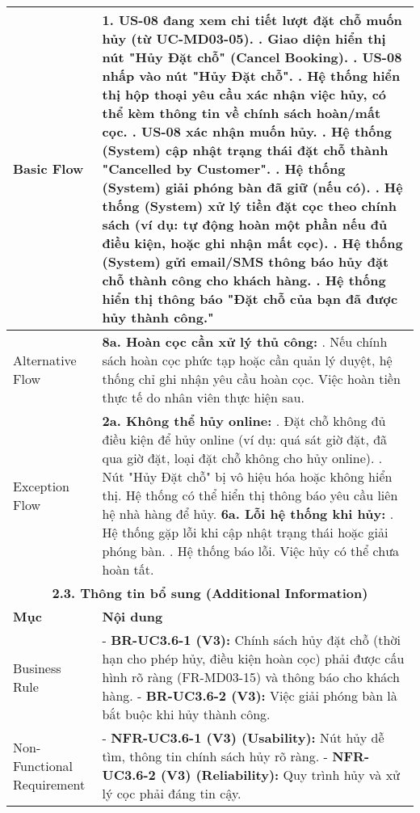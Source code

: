 \begin{longtable}{|m{4cm}|p{11cm}|}
Basic Flow & 1. US-08 đang xem chi tiết lượt đặt chỗ muốn hủy (từ UC-MD03-05). \newline 2. Giao diện hiển thị nút "Hủy Đặt chỗ" (Cancel Booking). \newline 3. US-08 nhấp vào nút "Hủy Đặt chỗ". \newline 4. Hệ thống hiển thị hộp thoại yêu cầu xác nhận việc hủy, có thể kèm thông tin về chính sách hoàn/mất cọc. \newline 5. US-08 xác nhận muốn hủy. \newline 6. Hệ thống (System) cập nhật trạng thái đặt chỗ thành "Cancelled by Customer". \newline 7. Hệ thống (System) giải phóng bàn đã giữ (nếu có). \newline 8. Hệ thống (System) xử lý tiền đặt cọc theo chính sách (ví dụ: tự động hoàn một phần nếu đủ điều kiện, hoặc ghi nhận mất cọc). \newline 9. Hệ thống (System) gửi email/SMS thông báo hủy đặt chỗ thành công cho khách hàng. \newline 10. Hệ thống hiển thị thông báo "Đặt chỗ của bạn đã được hủy thành công." \\
\hline
Alternative Flow & \textbf{8a. Hoàn cọc cần xử lý thủ công:} \newline    1. Nếu chính sách hoàn cọc phức tạp hoặc cần quản lý duyệt, hệ thống chỉ ghi nhận yêu cầu hoàn cọc. Việc hoàn tiền thực tế do nhân viên thực hiện sau. \\
\hline
Exception Flow & \textbf{2a. Không thể hủy online:} \newline    1. Đặt chỗ không đủ điều kiện để hủy online (ví dụ: quá sát giờ đặt, đã qua giờ đặt, loại đặt chỗ không cho hủy online). \newline    2. Nút "Hủy Đặt chỗ" bị vô hiệu hóa hoặc không hiển thị. Hệ thống có thể hiển thị thông báo yêu cầu liên hệ nhà hàng để hủy. \newline \textbf{6a. Lỗi hệ thống khi hủy:} \newline    1. Hệ thống gặp lỗi khi cập nhật trạng thái hoặc giải phóng bàn. \newline    2. Hệ thống báo lỗi. Việc hủy có thể chưa hoàn tất. \\
\hline
\multicolumn{2}{|c|}{\textbf{2.3. Thông tin bổ sung (Additional Information)}} \\
\hline
\textbf{Mục} & \textbf{Nội dung} \\
\hline
Business Rule & - \textbf{BR-UC3.6-1 (V3):} Chính sách hủy đặt chỗ (thời hạn cho phép hủy, điều kiện hoàn cọc) phải được cấu hình rõ ràng (FR-MD03-15) và thông báo cho khách hàng. \newline - \textbf{BR-UC3.6-2 (V3):} Việc giải phóng bàn là bắt buộc khi hủy thành công. \\
\hline
Non-Functional Requirement & - \textbf{NFR-UC3.6-1 (V3) (Usability):} Nút hủy dễ tìm, thông tin chính sách hủy rõ ràng. \newline - \textbf{NFR-UC3.6-2 (V3) (Reliability):} Quy trình hủy và xử lý cọc phải đáng tin cậy. \\
\hline
\end{longtable}

